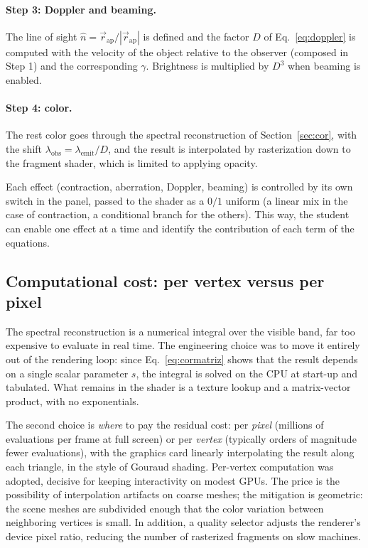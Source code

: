 \documentclass[10pt,a4paper,twocolumn]{article}
\begin{document}
\paragraph{Step 3: Doppler and beaming.} The line of sight
$\hat{n} = \vec{r}_{\mathrm{ap}}/|\vec{r}_{\mathrm{ap}}|$ is defined and the factor $D$
of Eq.~\eqref{eq:doppler} is computed with the velocity of the object relative to the
observer (composed in Step 1) and the corresponding $\gamma$. Brightness is multiplied by
$D^{3}$ when beaming is enabled.

\paragraph{Step 4: color.} The rest color goes through the spectral reconstruction of
Section~\ref{sec:cor}, with the shift $\lambda_{\mathrm{obs}} =
\lambda_{\mathrm{emit}}/D$, and the result is interpolated by rasterization down to the
fragment shader, which is limited to applying opacity.

Each effect (contraction, aberration, Doppler, beaming) is controlled by its own switch
in the panel, passed to the shader as a $0/1$ uniform (a linear mix in the case of
contraction, a conditional branch for the others). This way, the student can enable one
effect at a time and identify the contribution of each term of the equations.

\subsection{Computational cost: per vertex versus per pixel}

The spectral reconstruction is a numerical integral over the visible band, far too
expensive to evaluate in real time. The engineering choice was to move it entirely out of
the rendering loop: since Eq.~\eqref{eq:cormatriz} shows that the result depends on a
single scalar parameter $s$, the integral is solved on the CPU at start-up and tabulated.
What remains in the shader is a texture lookup and a matrix-vector product, with no
exponentials.

The second choice is \emph{where} to pay the residual cost: per \emph{pixel} (millions of
evaluations per frame at full screen) or per \emph{vertex} (typically orders of magnitude
fewer evaluations), with the graphics card linearly interpolating the result along each
triangle, in the style of Gouraud shading. Per-vertex computation was adopted, decisive
for keeping interactivity on modest GPUs. The price is the possibility of interpolation
artifacts on coarse meshes; the mitigation is geometric: the scene meshes are subdivided
enough that the color variation between neighboring vertices is small. In addition, a
quality selector adjusts the renderer's device pixel ratio, reducing the number of
rasterized fragments on slow machines.
\end{document}
